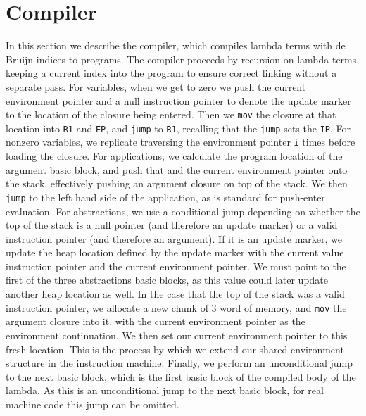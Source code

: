 \section{Compiler} \label{sec:compiler}

In this section we describe the compiler, which compiles lambda terms with
de Bruijn indices to programs. The compiler proceeds by recursion on lambda
terms, keeping a current index into the program to ensure correct linking
without a separate pass. For variables, when we get to zero we push the current
environment pointer and a null instruction pointer to denote the update marker
to the location of the closure being entered. Then we \texttt{mov} the closure
at that location into \texttt{R1} and \texttt{EP}, and \texttt{jump} to
\texttt{R1}, recalling that the \texttt{jump} sets the \texttt{IP}. For 
nonzero variables, we replicate traversing the environment pointer \texttt{i}
times before loading the closure.  For applications, we calculate the program
location of the argument basic block, and push that and the current environment
pointer onto the stack, effectively pushing an argument closure on top of the
stack. We then \texttt{jump} to the left hand side of the application, as is
standard for push-enter evaluation. For abstractions, we use a conditional jump
depending on whether the top of the stack is a null pointer (and therefore an
update marker) or a valid instruction pointer (and therefore an argument). If it
is an update marker, we update the heap location defined by the update marker
with the current value instruction pointer and the current environment pointer.
We must point to the first of the three abstractions basic blocks, as this value
could later update another heap location as well. In the case that the top of
the stack was a valid instruction pointer, we allocate a new chunk of 3 word of
memory, and \texttt{mov} the argument closure into it, with the current
environment pointer as the environment continuation. We then set our current
environment pointer to this fresh location. This is the process by which we
extend our shared environment structure in the instruction machine. Finally, we
perform an unconditional jump to the next basic block, which is the first basic
block of the compiled body of the lambda. As this is an unconditional jump to
the next basic block, for real machine code this jump can be omitted. 

